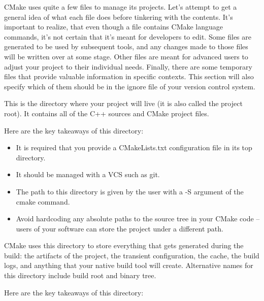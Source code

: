 

CMake uses quite a few files to manage its projects. Let's attempt to get a general idea of what each file does before tinkering with the contents. It's important to realize, that even though a file contains CMake language commands, it's not certain that it's meant for developers to edit. Some files are generated to be used by subsequent tools, and any changes made to those files will be written over at some stage. Other files are meant for advanced users to adjust your project to their individual needs. Finally, there are some temporary files that provide valuable information in specific contexts. This section will also specify which of them should be in the ignore file of your version control system.



This is the directory where your project will live (it is also called the project root). It contains all of the C++ sources and CMake project files.

Here are the key takeaways of this directory:

\begin{itemize}
\item 
It is required that you provide a CMakeLists.txt configuration file in its top directory.

\item 
It should be managed with a VCS such as git.

\item 
The path to this directory is given by the user with a -S argument of the cmake command.

\item 
Avoid hardcoding any absolute paths to the source tree in your CMake code – users of your software can store the project under a different path.
\end{itemize}


CMake uses this directory to store everything that gets generated during the build: the artifacts of the project, the transient configuration, the cache, the build logs, and anything that your native build tool will create. Alternative names for this directory include build root and binary tree.

Here are the key takeaways of this directory:

